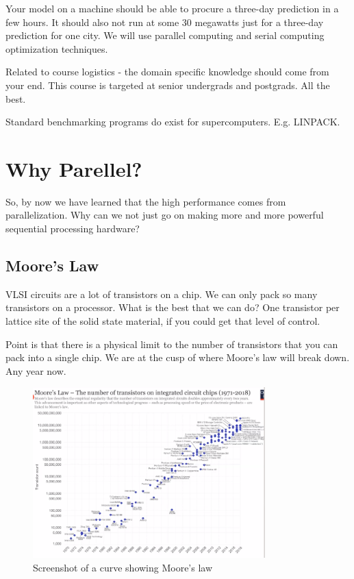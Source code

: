 \documentclass[a4paper]{article}
\begin{document}
Your model on a machine should be able to procure a three-day prediction
in a few hours. It should also not run at some 30 megawatts just for
a three-day prediction for one city. We will use parallel computing
and serial computing optimization techniques.

Related to course logistics - the domain specific knowledge should
come from your end. This course is targeted at senior undergrads and 
postgrads. All the best.

Standard benchmarking programs do exist for supercomputers. E.g. LINPACK.

\section*{Why Parellel?}
So, by now we have learned that the high performance comes from
parallelization. Why can we not just go on making more and more
powerful sequential processing hardware?

\subsection*{Moore's Law}
VLSI circuits are a lot of transistors on a chip. We can only pack
so many transistors on a processor. What is the best that we can do?
One transistor per lattice site of the solid state material, if you
could get that level of control.

Point is that there is a physical limit to the number of transistors
that you can pack into a single chip. We are at the cusp of where
Moore's law will break down. Any year now.

\begin{figure}[h]
	\centering
	\includegraphics[width=0.8\textwidth]{figures/moore.png}
	\caption{Screenshot of a curve showing Moore's law}
	\label{fig:figures-moore-png}
\end{figure}
\end{document}
